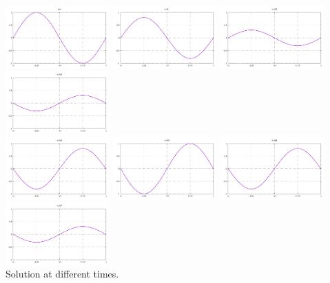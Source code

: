 \begin{center}
\includegraphics[width=4cm]{images/waveq/example1/u_0.pdf}
\includegraphics[width=4cm]{images/waveq/example1/u_1.pdf}
\includegraphics[width=4cm]{images/waveq/example1/u_2.pdf}
\includegraphics[width=4cm]{images/waveq/example1/u_3.pdf}\\
\includegraphics[width=4cm]{images/waveq/example1/u_4.pdf}
\includegraphics[width=4cm]{images/waveq/example1/u_5.pdf}
\includegraphics[width=4cm]{images/waveq/example1/u_6.pdf}
\includegraphics[width=4cm]{images/waveq/example1/u_7.pdf}\\
{\captionfont Solution at different times.}
\end{center}


